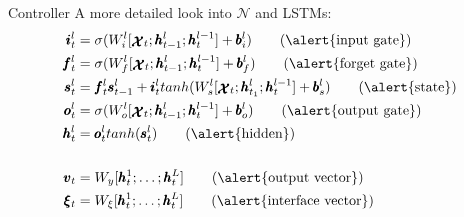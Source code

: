 \documentclass{beamer}
\newcommand{\xx}{\pmb{\raisebox{-1.5pt}{$\mathcal{X}$}}}
\newcommand{\hh}{\pmb{h}}
\newcommand{\ii}{\pmb{i}}
\newcommand{\oo}{\pmb{o}}
\newcommand{\ff}{\pmb{f}}
\newcommand{\Ss}{\pmb{s}}
\newcommand{\bb}{\pmb{b}}
\begin{document}
\begin{frame}{Controller}
	A more detailed look into $\mathcal{N}$ and LSTMs:\\
	\begin{align}
	\ii_t^l &= \sigma(W_i^l[\xx_t;\hh_{t-1}^l;\hh_t^{l-1}]+\bb_i^l)   \tag{\alert{input gate}}\\
	\ff_t^l &= \sigma(W_f^l[\xx_t;\hh_{t-1}^l;\hh_t^{l-1}]+\bb_f^l)	\tag{\alert{forget gate}}\\
	\Ss_t^l &= \ff_t^l\Ss_{t-1}^l + \ii_t^ltanh(W_s^l[\xx_t;\hh_{t_1}^l;\hh_t^{l-1}] + \bb_s^l)		\tag{\alert{state}}\\
	\oo_t^l &= \sigma(W_o^l[\xx_t;\hh_{t-1}^l;\hh_t^{l-1}]+\bb_o^l)		\tag{\alert{output gate}}\\
	\hh_t^l &= \oo_t^ltanh(\Ss_t^l)		\tag{\alert{hidden}}\\
	\nonumber \\ 
	\pmb{v}_t &= W_y[\hh_t^1;\dots;\hh_t^L]		\tag{\alert{output vector}}\\
	\pmb{\xi}_t &= W_{\xi}[\hh_t^1;\dots;\hh_t^L]		\tag{\alert{interface vector}}
	\end{align}
\end{frame}
\end{document}
